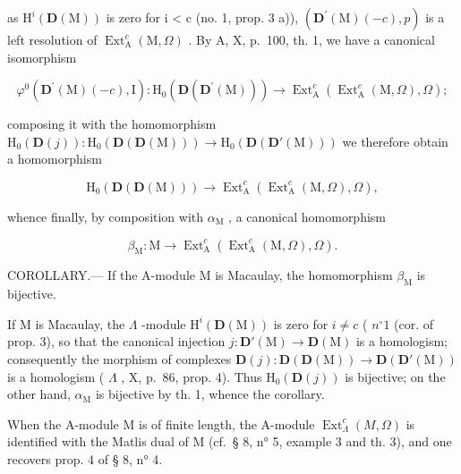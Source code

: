 as \(\mathrm{H}^{i}(\mathbf{D}(\mathrm{M}))\) is zero for i \textless{} c (no. 1, prop. 3 a)), \((\mathbf{D}^{\prime}(\mathrm{M})(-c), p)\) is a left resolution of \(\operatorname{Ext}_{\mathrm{A}}^{c}(\mathrm{M}, \Omega)\) . By A, X, p.~100, th. 1, we have a canonical isomorphism

\[
\varphi^ {0} \left(\mathbf {D} ^ {\prime} (\mathrm{M}) (- c), \mathrm{I}\right): \mathrm{H} _ {0} \left(\mathbf {D} \left(\mathbf {D} ^ {\prime} (\mathrm{M})\right)\right) \longrightarrow \operatorname{Ext} _ {\mathrm{A}} ^ {c} \left(\operatorname{Ext} _ {\mathrm{A}} ^ {c} (\mathrm{M}, \Omega), \Omega\right);
\]

composing it with the homomorphism \(\mathrm{H}_{0}(\mathbf{D}(j)) : \mathrm{H}_{0}(\mathbf{D}(\mathbf{D}(\mathrm{M}))) \to \mathrm{H}_{0}(\mathbf{D}(\mathbf{D}'(\mathrm{M})))\) we therefore obtain a homomorphism

\[
\mathrm{H} _ {0} (\mathbf {D} (\mathbf {D} (\mathrm{M}))) \longrightarrow \operatorname{Ext} _ {\mathrm{A}} ^ {c} \left(\operatorname{Ext} _ {\mathrm{A}} ^ {c} (\mathrm{M}, \Omega), \Omega\right),
\]

whence finally, by composition with \(\alpha_{\mathrm{M}}\) , a canonical homomorphism

\[
\beta_ {\mathrm{M}}: \mathrm{M} \longrightarrow \operatorname{Ext} _ {\mathrm{A}} ^ {c} (\operatorname{Ext} _ {\mathrm{A}} ^ {c} (\mathrm{M}, \Omega), \Omega).
\]

COROLLARY.--- If the A-module M is Macaulay, the homomorphism \(\beta_{\mathrm{M}}\) is bijective.

If M is Macaulay, the \(\Lambda\) -module \(\mathrm{H}^i(\mathbf{D}(\mathrm{M}))\) is zero for \(i \neq c\) ( \(n^\circ 1\) (cor. of prop. 3), so that the canonical injection \(j: \mathbf{D}'(\mathrm{M}) \to \mathbf{D}(\mathrm{M})\) is a homologism; consequently the morphism of complexes \(\mathbf{D}(j): \mathbf{D}(\mathbf{D}(\mathrm{M})) \to \mathbf{D}(\mathbf{D}'(\mathrm{M}))\) is a homologism ( \(\Lambda\) , X, p.~86, prop. 4). Thus \(\mathrm{H}_0(\mathbf{D}(j))\) is bijective; on the other hand, \(\alpha_{\mathrm{M}}\) is bijective by th. 1, whence the corollary.

When the A-module M is of finite length, the A-module \(\operatorname{Ext}_{\Lambda}^{c}(M,\Omega)\) is identified with the Matlis dual of M (cf.~§ 8, n° 5, example 3 and th. 3), and one recovers prop. 4 of § 8, n° 4.

